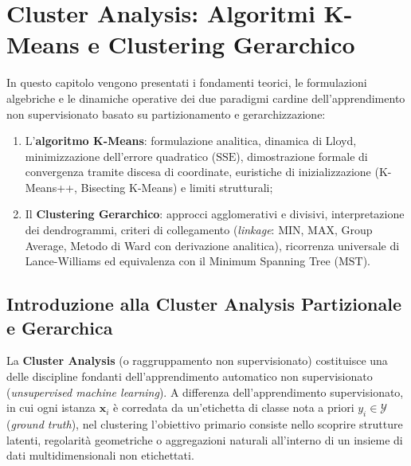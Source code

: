 \chapter{Cluster Analysis: Algoritmi K-Means e Clustering Gerarchico}
\label{chap:dm-kmeans-hierarchical}

In questo capitolo vengono presentati i fondamenti teorici, le formulazioni algebriche e le dinamiche operative dei due paradigmi cardine dell'apprendimento non supervisionato basato su partizionamento e gerarchizzazione:
\begin{enumerate}[noitemsep]
    \item L'\textbf{algoritmo K-Means}: formulazione analitica, dinamica di Lloyd, minimizzazione dell'errore quadratico ($\mathrm{SSE}$), dimostrazione formale di convergenza tramite discesa di coordinate, euristiche di inizializzazione (K-Means++, Bisecting K-Means) e limiti strutturali;
    \item Il \textbf{Clustering Gerarchico}: approcci agglomerativi e divisivi, interpretazione dei dendrogrammi, criteri di collegamento (\textit{linkage}: MIN, MAX, Group Average, Metodo di Ward con derivazione analitica), ricorrenza universale di Lance-Williams ed equivalenza con il Minimum Spanning Tree ($\mathrm{MST}$).
\end{enumerate}

\section{Introduzione alla Cluster Analysis Partizionale e Gerarchica}
\label{sec:dm-clustering-intro-taxonomy}

La \textbf{Cluster Analysis} (o raggruppamento non supervisionato) costituisce una delle discipline fondanti dell'apprendimento automatico non supervisionato (\textit{unsupervised machine learning}). A differenza dell'apprendimento supervisionato, in cui ogni istanza $\mathbf{x}_i$ è corredata da un'etichetta di classe nota a priori $y_i \in \mathcal{Y}$ (\textit{ground truth}), nel clustering l'obiettivo primario consiste nello scoprire strutture latenti, regolarità geometriche o aggregazioni naturali all'interno di un insieme di dati multidimensionali non etichettati.

